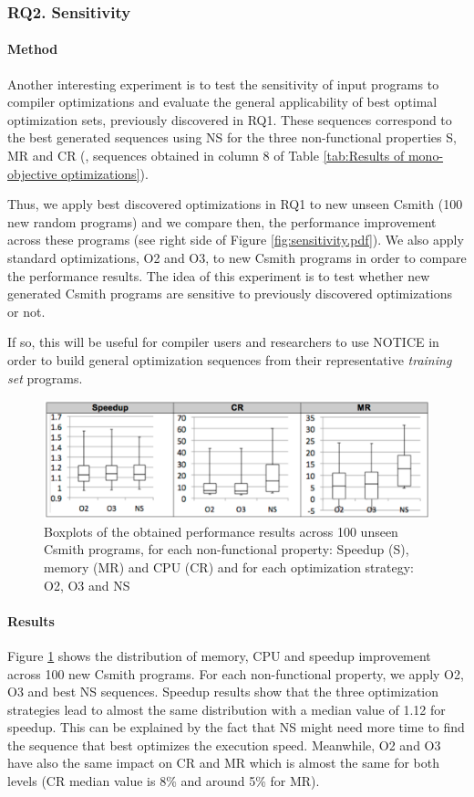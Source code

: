 \subsubsection{RQ2. Sensitivity}
\paragraph{Method}
Another interesting experiment is to test the sensitivity of input programs to compiler optimizations and evaluate the general applicability of best optimal optimization sets, previously discovered in RQ1. These sequences correspond to the best generated sequences using NS for the three non-functional properties S, MR and CR (\ie, sequences obtained in column 8 of Table \ref{tab:Results of mono-objective optimizations}). 

Thus, we apply best discovered optimizations in RQ1 to new unseen Csmith (100 new random programs) and we compare then, the performance improvement across these programs (see right side of Figure \ref{fig:sensitivity.pdf}). We also apply standard optimizations, O2 and O3, to new Csmith programs in order to compare the performance results.
The idea of this experiment is to test whether new generated Csmith programs are sensitive to previously discovered optimizations or not. 

If so, this will be useful for compiler users and researchers to use NOTICE in order to build general optimization sequences from their representative \textit{training set} programs.

\begin{figure}[h]
	\centering
	\includegraphics[width=1.\linewidth]{chapitre3/fig/box.pdf}
	\caption{Boxplots of the obtained performance results across 100 unseen Csmith programs, for each non-functional property: Speedup (S), memory (MR) and CPU (CR) and for each optimization strategy: O2, O3 and NS}
	\label{fig:box.pdf}
\end{figure}

\paragraph{Results}
Figure \ref{fig:box.pdf} shows the distribution of memory, CPU and speedup improvement across 100 new Csmith programs. For each non-functional property, we apply O2, O3 and best NS sequences. Speedup results show that the three optimization strategies lead to almost the same distribution with a median value of 1.12 for speedup. 
This can be explained by the fact that NS might need more time to find the sequence that best optimizes the execution speed. Meanwhile, O2 and O3 have also the same impact on CR and MR which is almost the same for both levels (CR median value is 8\% and around 5\% for MR).

